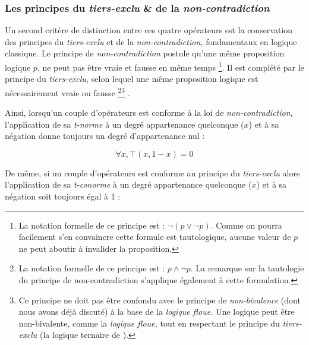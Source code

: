 

\subsubsection{Les principes du \emph{tiers-exclu} \& de la
  \emph{non-contradiction}}

Un second critère de distinction entre ces quatre opérateurs est la
conservation des principes du \emph{tiers-exclu} et de la
\emph{non-contradiction,} fondamentaux en logique classique. Le
principe de \emph{non-contradiction} postule qu'une même proposition
logique \(p\), ne peut pas être vraie et fausse en même temps
\footnote{La notation formelle de ce principe est :
  \(\neg(p \vee \neg p) \). Comme on pourra facilement s'en convaincre
  cette formule est tautologique, aucune valeur de \(p\) ne peut
  aboutir à invalider la proposition.}. Il est complété par le
principe du \emph{tiers-exclu,} selon lequel une même proposition
logique est nécessairement vraie ou fausse \footnote{La notation
  formelle de ce principe est : \(p \wedge \neg p\). La remarque sur
  la tautologie du principe de non-contradiction s'applique également
  à cette formulation.}\multiplefootnoteseparator \footnote{Ce
  principe ne doit pas être confondu avec le principe de
  \emph{non-bivalence} (dont nous avons déjà discuté) à la base de la
  \emph{logique floue.}  Une logique peut être non-bivalente, comme la
  \emph{logique floue,} tout en respectant le principe du
  \emph{tiers-exclu} (\eg la logique ternaire de ).}
\autocite{Horn2018}.






Ainsi, lorsqu'un couple d'opérateurs est conforme à la loi de
\emph{non-contradiction,} l’application de sa \emph{t-norme} à un
degré appartenance quelconque (\(x\)) et à sa négation donne toujours
un degré d'appartenance nul :

\begin{equation}
  \forall x, ⊤(x,1-x) = 0
\end{equation}

De même, si un couple d'opérateurs est conforme au principe du
\emph{tiers-exclu} alors l’application de sa \emph{t-conorme} à un
degré appartenance quelconque (\(x\))  et à sa négation soit
toujours égal à 1 :

